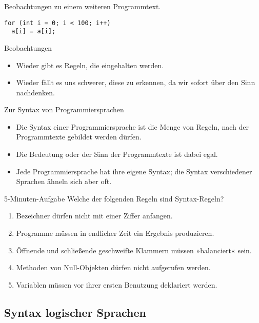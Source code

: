 \begin{frame}[fragile]{Beobachtungen zu einem weiteren Programmtext.}
  
\begin{verbatim}
for (int i = 0; i < 100; i++)
  a[i] = a[i];
\end{verbatim}
  \begin{block}{Beobachtungen}
    \begin{itemize}
    \item Wieder gibt es Regeln, die eingehalten werden.
    \item Wieder fällt es uns \alert{schwerer}, diese zu erkennen, da
      wir \alert{sofort über den Sinn nachdenken}.
    \end{itemize}
  \end{block}
\end{frame}


\begin{frame}{Zur Syntax von Programmiersprachen}
  \begin{itemize}
  \item Die \alert{Syntax} einer Programmiersprache ist die
    \alert{Menge von Regeln}, nach der Programmtexte gebildet werden 
    dürfen.
  \item Die \alert{Bedeutung} oder der \alert{Sinn} der Programmtexte
    ist dabei egal.
  \item
    Jede Programmiersprache hat ihre eigene Syntax; die Syntax
    verschiedener Sprachen ähneln sich aber oft.
  \end{itemize}  
\end{frame}

\begin{frame}{5-Minuten-Aufgabe}
  Welche der folgenden Regeln sind Syntax-Regeln?
  \begin{enumerate}
  \item Bezeichner dürfen nicht mit einer Ziffer anfangen.
  \item Programme müssen in endlicher Zeit ein Ergebnis produzieren.
  \item Öffnende und schließende geschweifte Klammern  müssen
    »balanciert« sein. 
  \item Methoden von Null-Objekten dürfen nicht aufgerufen werden.
  \item Variablen müssen vor ihrer ersten Benutzung deklariert werden.
  \end{enumerate}  
\end{frame}


\subsection[Syntax\protect\\ logischer Sprachen]{Syntax logischer Sprachen}

